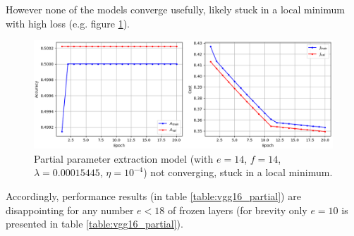 However none of the models converge usefully, likely stuck in a local minimum with high loss (e.g. figure \ref{fig:vgg16_partial_divergence}).

\begin{figure}[ht]
    \centering
    \includegraphics[width=1.0\textwidth]{figs/vgg16_partial_divergence.png}
    \caption{Partial parameter extraction model (with $e = 14$, $f = 14$, $\lambda = 0.00015445$, $\eta = 10^{-4}$) not converging, stuck in a local minimum.}
    \label{fig:vgg16_partial_divergence}
\end{figure}

Accordingly, performance results (in table \ref{table:vgg16_partial}) are disappointing for any number $e < 18$ of frozen layers (for brevity only $e = 10$ is presented in table \ref{table:vgg16_partial}).

